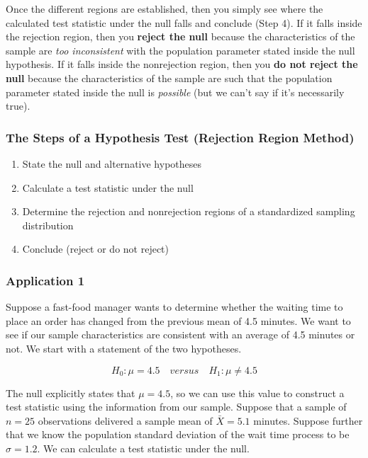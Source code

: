 \documentclass[
]{book}
\begin{document}
Once the different regions are established, then you simply see where the calculated test statistic under the null falls and conclude (Step 4). If it falls inside the rejection region, then you \textbf{reject the null} because the characteristics of the sample are \emph{too inconsistent} with the population parameter stated inside the null hypothesis. If it falls inside the nonrejection region, then you \textbf{do not reject the null} because the characteristics of the sample are such that the population parameter stated inside the null is \emph{possible} (but we can't say if it's necessarily true).

\hypertarget{the-steps-of-a-hypothesis-test-rejection-region-method}{%
\subsubsection*{The Steps of a Hypothesis Test (Rejection Region Method)}\label{the-steps-of-a-hypothesis-test-rejection-region-method}}

\begin{enumerate}
\def\labelenumi{\arabic{enumi}.}
\item
  State the null and alternative hypotheses
\item
  Calculate a test statistic under the null
\item
  Determine the rejection and nonrejection regions of a standardized sampling distribution
\item
  Conclude (reject or do not reject)
\end{enumerate}

\hypertarget{application-1-1}{%
\subsubsection*{Application 1}\label{application-1-1}}

Suppose a fast-food manager wants to determine whether the waiting time to place an order has changed from the previous mean of 4.5 minutes. We want to see if our sample characteristics are consistent with an average of 4.5 minutes or not. We start with a statement of the two hypotheses.

\[H_0:\mu=4.5 \quad versus \quad H_1:\mu\neq 4.5\]

The null explicitly states that \(\mu=4.5\), so we can use this value to construct a test statistic using the information from our sample. Suppose that a sample of \(n=25\) observations delivered a sample mean of \(\bar{X}=5.1\) minutes. Suppose further that we know the population standard deviation of the wait time process to be \(\sigma=1.2\). We can calculate a test statistic under the null.
\end{document}
